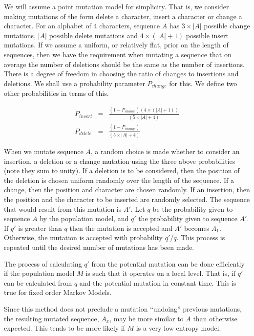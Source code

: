 \documentclass[a4paper,11pt,oneside]{article}
\begin{document}
We will assume a point mutation model for simplicity.  That is, we consider
making mutations of the form delete a character, insert a character or change
a character.  For an alphabet of 4 characters, sequence $A$ has $3\times|A|$
possible change mutations, $|A|$ possible delete mutations and
$4\times(|A|+1)$ possible insert mutations.  If we assume a uniform, or
relatively flat, prior on the length of sequences, then we have the
requirement when mutating a sequence that on average the number of deletions
should be the same as the number of insertions.  There is a degree of freedom
in choosing the ratio of changes to insertions and deletions.  We shall use a
probability parameter $P_{change}$ for this.  We define two other probabilities
in terms of this.

\begin{eqnarray*}
P_{insert} & = & \frac{(1-P_{change})(4\times(|A|+1))}{(5\times|A|+4)} \\
P_{delete} & = & \frac{(1-P_{change})}{(5\times|A|+4)}
\end{eqnarray*}

When we mutate sequence $A$, a random choice is made whether to consider an
insertion, a deletion or a change mutation using the three above probabilities
(note they sum to unity).  If a deletion is to be considered, then the
position of the deletion is chosen uniform randomly over the length of the
sequence.  If a change, then the position and character are chosen randomly.
If an insertion, then the position and the character to be inserted are
randomly selected.  The sequence that would result from this mutation is $A'$.
Let $q$ be the probability given to sequence $A$ by the population model, and
$q'$ the probability given to sequence $A'$.  If $q'$ is greater than $q$ then
the mutation is accepted and $A'$ becomes $A_1$.  Otherwise, the mutation is
accepted with probability $q'/q$.  This process is repeated until the desired
number of mutations has been made.

The process of calculating $q'$ from the potential mutation can be done
efficiently if the population model $M$ is such that it operates on a local
level.  That is, if $q'$ can be calculated from $q$ and the potential mutation
in constant time.  This is true for fixed order Markov Models.

Since this method does not preclude a mutation ``undoing'' previous mutations,
the resulting mutated sequence, $A_x$, may be more similar to $A$ than
otherwise expected.  This tends to be more likely if $M$ is a very low entropy
model.
\end{document}
